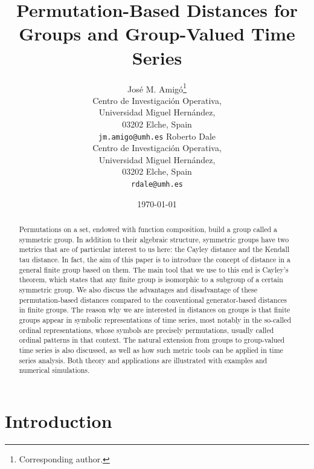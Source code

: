 \documentclass{article}
\date{\today}
\author{Jos\'e M. Amig\'o\thanks{Corresponding author.} \\
Centro de Investigaci\'{o}n Operativa, \\
Universidad Miguel Hern\'{a}ndez, \\
03202 Elche, Spain \\
\texttt{jm.amigo@umh.es}
\And
Roberto Dale \\
Centro de Investigaci\'{o}n Operativa, \\
Universidad Miguel Hern\'{a}ndez, \\
03202 Elche, Spain \\
\texttt{rdale@umh.es}
}
\begin{document}
\title{\boldmath Permutation-Based Distances for Groups and Group-Valued Time Series}

\maketitle

\begin{abstract}
Permutations on a set, endowed with function composition,
build a group called a symmetric group. In addition to their algebraic
structure, symmetric groups have two metrics that are of particular interest to us here: the Cayley distance and the Kendall tau distance. In fact, the aim of this paper is to introduce the concept of distance in a general finite group based on them. The main tool that we use to this end is Cayley's theorem, which states that any finite group is isomorphic to a subgroup of a certain symmetric group. We also discuss the advantages and disadvantage of these permutation-based distances compared to the conventional generator-based distances in finite groups. The reason why we
are interested in distances on groups is that finite groups appear in
symbolic representations of time series, most notably in the so-called
ordinal representations, whose symbols are precisely permutations, usually called ordinal patterns in that context. The natural extension from groups to group-valued time series is also discussed, as well as how such metric tools can be applied in time series analysis. Both theory and applications are illustrated with examples and numerical simulations.
\end{abstract}


\section{Introduction}
\label{sec:Intro}
\end{document}
